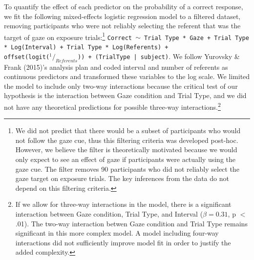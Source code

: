 \documentclass[authoryear, review]{elsarticle}
\begin{document}
To quantify the effect of each predictor on the probability of a correct
response, we fit the following mixed-effects logistic regression model
to a filtered dataset, removing participants who were not reliably
selecting the referent that was the target of gaze on exposure
trials:\footnote{We did not predict that there would be a subset of participants who would not follow the gaze cue, thus this filtering criteria was developed post-hoc. However, we believe the filter is theoretically motivated because we would only expect to see an effect of gaze if participants were actually using the gaze cue. The filter removes 90 participants who did not reliably select the gaze target on exposure trials. The key inferences from the data do not depend on this filtering criteria.}
\texttt{Correct $\sim$ Trial Type * Gaze + Trial Type * Log(Interval) + Trial Type * Log(Referents) + \\ offset(logit($^1/_{Referents}$)) + (TrialType | subject)}.
We follow Yurovsky \& Frank (2015)'s analysis plan and coded interval
and number of referents as continuous predictors and transformed these
variables to the log scale. We limited the model to include only two-way
interactions because the critical test of our hypothesis is the
interaction between Gaze condition and Trial Type, and we did not have
any theoretical predictions for possible three-way
interactions.\footnote{If we allow for three-way interactions in the model, there is a significant interaction between Gaze condition, Trial Type, and Interval ($\beta = 0.31$, p $<$ .01). The two-way interaction betwen Gaze condition and Trial Type remains significant in this more complex model. A model including four-way interactions did not sufficiently improve model fit in order to justify the added complexity.}
\end{document}
